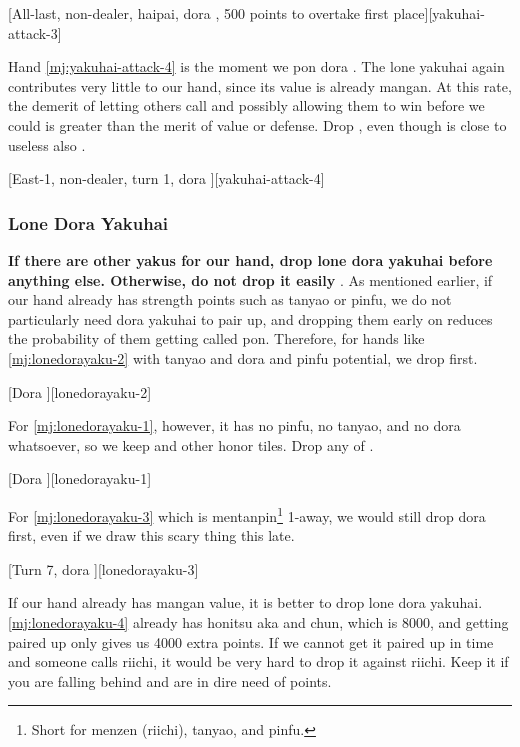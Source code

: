 \documentclass[12pt]{article}
\begin{document}
[All-last, non-dealer, haipai, dora , 500 points to overtake first place][yakuhai-attack-3]

Hand \ref{mj:yakuhai-attack-4} is the moment we pon dora . The lone yakuhai  again contributes very little to our hand, since its value is already mangan. At this rate, the demerit of letting others call and possibly allowing them to win before we could is greater than the merit of value or defense. Drop , even though  is close to useless also \citep[][pp.~183--184]{kawamura-naki}.

[East-1, non-dealer, turn 1, dora ][yakuhai-attack-4]



\subsubsection*{Lone Dora Yakuhai}

\textbf{If there are other yakus for our hand, drop lone dora yakuhai before anything else. Otherwise, do not drop it easily} \citep{yoteru-lonedorayakuhai}. As mentioned earlier, if our hand already has strength points such as tanyao or pinfu, we do not particularly need dora yakuhai to pair up, and dropping them early on reduces the probability of them getting called pon. Therefore, for hands like \ref{mj:lonedorayaku-2} with tanyao and dora and pinfu potential, we drop  first.

[Dora ][lonedorayaku-2]

For \ref{mj:lonedorayaku-1}, however, it has no pinfu, no tanyao, and no dora whatsoever, so we keep  and other honor tiles. Drop any of .

[Dora ][lonedorayaku-1]

For \ref{mj:lonedorayaku-3} which is mentanpin\footnote{Short for menzen (riichi), tanyao, and pinfu.} 1-away, we would still drop dora  first, even if we draw this scary thing this late.

[Turn 7, dora ][lonedorayaku-3]

If our hand already has mangan value, it is better to drop lone dora yakuhai. \ref{mj:lonedorayaku-4} already has honitsu aka and chun, which is 8000, and getting  paired up only gives us 4000 extra points. If we cannot get it paired up in time and someone calls riichi, it would be very hard to drop it against riichi. Keep it if you are falling behind and are in dire need of points.
\end{document}
